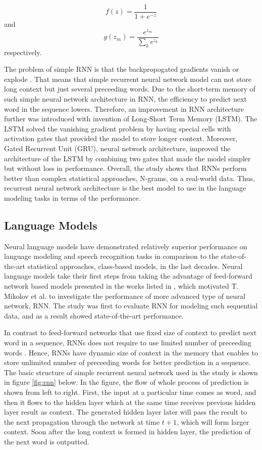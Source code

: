 \documentclass{IEEEtran}
\begin{document}
\begin{equation}
	f(z) = \frac{1}{1+e^{-z}}
\end{equation}
and
\begin{equation}
	g(z_m) = \frac{e^{z_m}}{\sum_k{e^{z_k}}}
\end{equation}
respectively.

The problem of simple RNN is that the backpropogated gradients vanish or explode \cite{rnn}. That means that simple recurrent neural network model can not store long context but just several preceeding words. Due to the short-term memory of such simple neural network architecture in RNN, the efficiency to predict next word in the sequence lowers. Therefore, an improvement in RNN architecture further was introduced with invention of Long-Short Term Memory (LSTM). The LSTM solved the vanishing gradient problem by having special cells with activation gates that provided the model to store longer context. Moreover, Gated Recurrent Unit (GRU), neural network architecture, improved the architecture of the LSTM by combining two gates that made the model simpler but without loss in performance. Overall, the study \cite{rnn} shows that RNNs perform better than complex statistical approaches, N-grams, on a real-world data. Thus, recurrent neural network architecture is the best model to use in the language modeling tasks in terms of the performance.

\subsection{Language Models}

Neural language models have demonstrated relatively superior performance on language modeling and speech recognition tasks in comparison to the state-of-the-art statistical approaches, class-based models, in the last decades. Neural language models take their first steps from taking the advantage of feed-forward network based models presented in the works listed in \cite{Mikolov2010NeuralLM}, which motivated T. Mikolov et al. to investigate the performance of more advanced type of neural network, RNN. The study was first to evaluate RNN for modeling such sequential data, and as a result showed state-of-the-art performance.

In contrast to feed-forward networks that use fixed size of context to predict next word in a sequence, RNNs does not require to use limited number of preceeding words \cite{Mikolov2010NeuralLM}. Hence, RNNs have dynamic size of context in the memory that enables to store unlimited number of preceeding words for better prediction in a sequence. The basic structure of simple recurrent neural network used in the study is shown in figure \ref{fig:rnn} below. In the figure, the flow of whole process of prediction is shown from left to right. First, the input at a particular time comes as word, and then it flows to the hidden layer which at the same time receives previous hidden layer result as context. The generated hidden layer later will pass the result to the next propagation through the network at time \(t+1\), which will form larger context. Soon after the long context is formed in hidden layer, the prediction of the next word is outputted.
\end{document}
